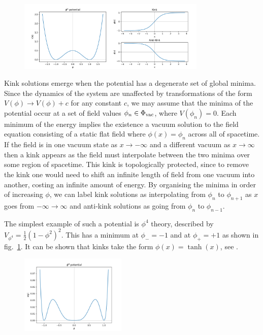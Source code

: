 \documentclass[11pt, oneside,titlepage]{article}  	%
\numberwithin{equation}{section}
\begin{document}
 \begin{figure}
\centering
 \includegraphics[width=0.8\textwidth]{phi4_potential.png}
  \label{phi4pot}
\end{figure}
Kink solutions emerge when the potential has a degenerate set of global minima. Since the dynamics of the system are unaffected by transformations of the form $V(\phi)\rightarrow V(\phi) + c$ for any constant $c$, we may assume that the minima of the potential occur at a set of field values $\phi_n \in \Phi_{\textup{vac}}$, where $V(\phi_n) = 0$. Each minimum of the energy implies the existence a vacuum solution to the field equation consisting of a static flat field where $\phi(x) = \phi_n$ across all of spacetime. If the field is in one vacuum state as $x\rightarrow -\infty$ and a different vacuum as $x\rightarrow \infty$ then a kink appears as the field must interpolate between the two minima over some region of spacetime. This kink is topologically protected, since to remove the kink one would need to shift an infinite length of field from one vacuum into another, costing an infinite amount of energy. By organising the minima in order of increasing $\phi$, we can label kink solutions as interpolating from $\phi_n$ to $\phi_{n+1}$ as $x$ goes from $-\infty \rightarrow \infty$ and anti-kink solutions as going from $\phi_n$ to $\phi_{n-1}$.\par
 The simplest example of such a potential is $\phi^4$ theory, described by $V_{\phi^4} = \frac{1}{2} (1-\phi^2)^2$. This has a minimum at $\phi_{-} = -1$ and at $\phi_{+} = +1$ as shown in fig.~\ref{phi4pot}. It can be shown that kinks take the form $\phi(x) = \tanh(x)$, see \cite{manton-book}.\par
 \begin{figure}
\vspace{-10pt}
\centering
 \includegraphics[width=0.45\textwidth]{phi8_potential.png}
  \label{phi8pot}
\end{figure}
\end{document}
